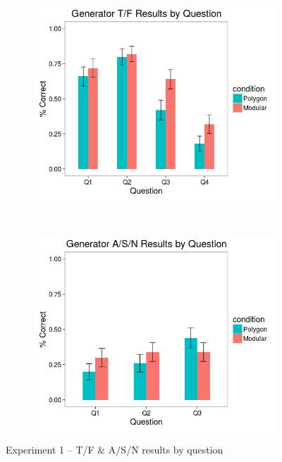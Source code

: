 \documentclass[man,10pt]{apa6}
\begin{document}
\begin{figure}[H]
\centering
\begin{subfigure}[c]{0.45\textwidth}
\centering
\includegraphics[width=\textwidth]{figures/1/gen_TF_by_Q.png}
\end{subfigure}
~
\begin{subfigure}[c]{0.45\textwidth}
\centering
\includegraphics[width=\textwidth]{figures/1/gen_ASN_by_Q.png}
\end{subfigure}
\caption{Experiment 1 -- T/F \& A/S/N results by question}
\end{figure}\noindent 
\end{document}
